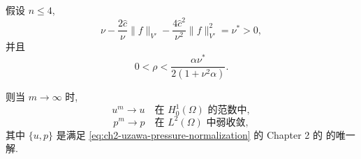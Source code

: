\begin{Proposition}
\label{prop:ch2-arrow-hurwicz-convergence}
假设 $n\leq4$,
\begin{equation}
\nu-\frac{2\widehat c}\nu\lVert f\rVert_{V'}
-\frac{4\widehat c^2}{\nu^2}\lVert f\rVert_{V'}^2
=\nu^*>0,
\label{eq:ch2-arrow-hurwicz-coercivity-condition}
\end{equation}
并且
\begin{equation}
0<\rho<\frac{\alpha\nu^*}{2(1+\nu^2\alpha)}.
\label{eq:ch2-arrow-hurwicz-step-condition}
\end{equation}

则当 $m\to\infty$ 时,
\begin{equation}
u^m\longrightarrow u\quad\text{在 }H_0^1(\Omega)\text{ 的范数中},
\label{eq:ch2-arrow-hurwicz-velocity-convergence}
\end{equation}
\begin{equation}
p^m\longrightarrow p\quad\text{在 }L^2(\Omega)\text{ 中弱收敛},
\label{eq:ch2-arrow-hurwicz-pressure-convergence}
\end{equation}
其中 $\{u,p\}$ 是满足 \eqref{eq:ch2-uzawa-pressure-normalization} 的 Chapter 2 的  的唯一解.
\end{Proposition}

